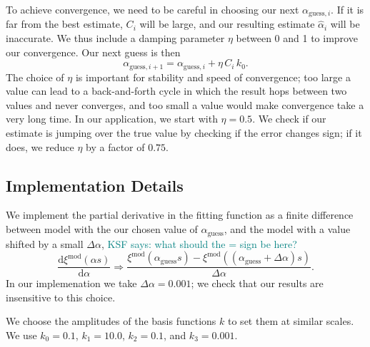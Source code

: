 \documentclass[modern]{aastex62}
\newcommand{\dd}{\mathrm{d}}
\newcommand{\KSF}[1]{\textcolor{teal}{KSF says: #1}}
\begin{document}
To achieve convergence, we need to be careful in choosing our next $\alpha_{\mathrm{guess},i}$.
If it is far from the best estimate, $C_i$ will be large, and our resulting estimate $\hat{\alpha}_{i}$ will be inaccurate.
We thus include a damping parameter $\eta$ between 0 and 1 to improve our convergence.
Our next guess is then
\begin{equation}
    \alpha_{\mathrm{guess},i+1} = \alpha_{\mathrm{guess},i} + \eta \, C_i \, k_0.
\end{equation}
The choice of $\eta$ is important for stability and speed of convergence; too large a value can lead to a back-and-forth cycle in which the result hops between two values and never converges, and too small a value would make convergence take a very long time.
In our application, we start with $\eta=0.5$.
We check if our estimate is jumping over the true value by checking if the error changes sign; if it does, we reduce $\eta$ by a factor of $0.75$.

\subsection{Implementation Details}

We implement the partial derivative in the fitting function as a finite difference between model with the our chosen value of $\alpha_\mathrm{guess}$, and the model with a value shifted by a small $\Delta \alpha$,
\KSF{what should the = sign be here?}
\begin{equation}
    \frac{\dd \xi^\mathrm{mod}(\alpha s)}{\dd \alpha} \Rightarrow \frac{\xi^\mathrm{mod}(\alpha_\mathrm{guess} s) - \xi^\mathrm{mod}((\alpha_\mathrm{guess} + \Delta \alpha)s)}{\Delta \alpha}.
\end{equation}
In our implemenation we take $\Delta \alpha = 0.001$; we check that our results are insensitive to this choice.

We choose the amplitudes of the basis functions $k$ to set them at similar scales.
We use $k_0=0.1$, $k_1=10.0$, $k_2=0.1$, and $k_3=0.001$.

% 
%

\end{document}
